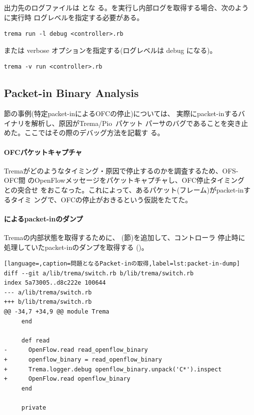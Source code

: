 出力先のログファイルは  とな
る。を実行し内部ログを取得する場合、次のように実行時
ログレベルを指定する必要がある。
\begin{lstlisting}
trema run -l debug <controller>.rb
\end{lstlisting}
または verbose オプションを指定する(ログレベルは debug になる)。
\begin{lstlisting}
trema -v run <controller>.rb
\end{lstlisting}

  \subsection{Packet-in Binary Analysis}
  \label{sec:trema-packet-in-analysis}

\label{sec:trema-logger}節の事例(特定packet-inによるOFCの停止)については、
実際にpacket-inするバイナリを解析し、原因がTrema/Pio~\cite{pio}パケット
パーサのバグであることを突き止めた。ここではその際のデバッグ方法を記載す
る。

    \paragraph{OFCパケットキャプチャ}
Tremaがどのようなタイミング・原因で停止するのかを調査するため、OFS-OFC間
のOpenFlowメッセージをパケットキャプチャし、OFC停止タイミングとの突合せ
をおこなった。これによって、あるパケット(フレーム)がpacket-inするタイミ
ングで、OFCの停止がおきるという仮説をたてた。

    \paragraph{によるpacket-inのダンプ}
Tremaの内部状態を取得するために、
(\label{sec:trema-logger}節)を追加して、コントローラ
停止時に処理していたpacket-inのダンプを取得する
()。
\begin{lstlisting}[language=,caption=問題となるPacket-inの取得,label=lst:packet-in-dump]
diff --git a/lib/trema/switch.rb b/lib/trema/switch.rb
index 5a73005..d8c222e 100644
--- a/lib/trema/switch.rb
+++ b/lib/trema/switch.rb
@@ -34,7 +34,9 @@ module Trema
     end

     def read
-      OpenFlow.read read_openflow_binary
+      openflow_binary = read_openflow_binary
+      Trema.logger.debug openflow_binary.unpack('C*').inspect
+      OpenFlow.read openflow_binary
     end

     private
\end{lstlisting}

